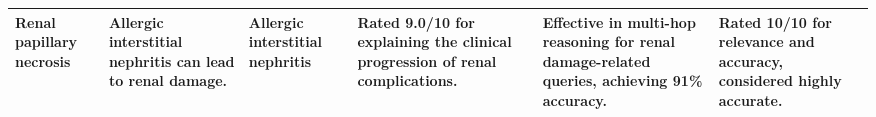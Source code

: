 \begin{table*}[ht]
{\begin{tabular}{|p{2cm}|p{3cm}|p{2cm}|p{3cm}|p{3cm}|p{3cm}|}
Renal papillary necrosis & Allergic interstitial nephritis can lead to renal damage. & Allergic interstitial nephritis & Rated 9.0/10 for explaining the clinical progression of renal complications. & Effective in multi-hop reasoning for renal damage-related queries, achieving 91\% accuracy. & Rated 10/10 for relevance and accuracy, considered highly accurate.\\ \hline
\end{tabular}}
\end{table*}

